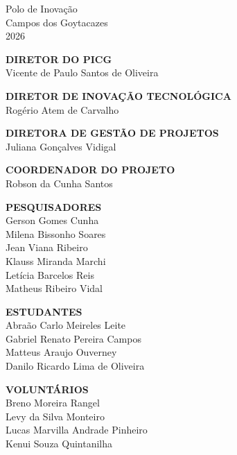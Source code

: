 \begin{center}
    \vfill
    \centering
    Polo de Inovação\\
    Campos dos Goytacazes\\
    2026

    \newpage

    \vfill
    \textbf{DIRETOR DO PICG}\\
    Vicente de Paulo Santos de Oliveira
    \vfill
    
    \textbf{DIRETOR DE INOVAÇÃO TECNOLÓGICA}\\
    Rogério Atem de Carvalho
    \vfill
    
    \textbf{DIRETORA DE GESTÃO DE PROJETOS}\\
    Juliana Gonçalves Vidigal
    \vfill
    
    \textbf{COORDENADOR DO PROJETO}\\
    Robson da Cunha Santos
    \vfill
    
    \textbf{PESQUISADORES}\\
    Gerson Gomes Cunha\\
    Milena Bissonho Soares\\
    Jean Viana Ribeiro \\
    Klauss Miranda Marchi \\
    Letícia Barcelos Reis \\
    Matheus Ribeiro Vidal
    \vfill
    
    \textbf{ESTUDANTES}\\
    Abraão Carlo Meireles Leite\\
    Gabriel Renato Pereira Campos\\
    Matteus Araujo Ouverney\\
    Danilo Ricardo Lima de Oliveira
    \vfill

    \textbf{VOLUNTÁRIOS}\\
    Breno Moreira Rangel\\
    Levy da Silva Monteiro\\
    Lucas Marvilla Andrade Pinheiro\\
    Kenui Souza Quintanilha
    \vfill
\end{center}